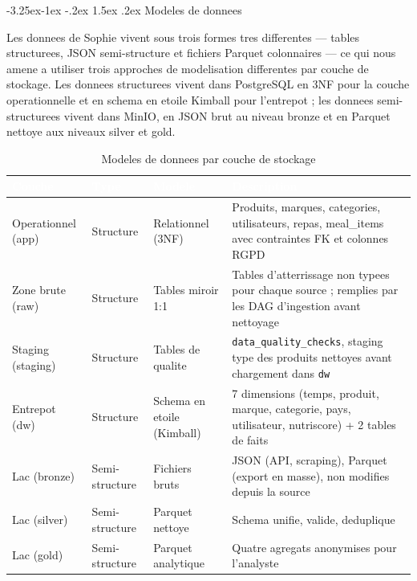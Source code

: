 \documentclass[a4paper,11pt,oneside,openany]{report}
\makeatletter
\renewcommand\subsubsection{\@startsection{subsubsection}{3}{\z@}%
  {-3.25ex\@plus -1ex \@minus -.2ex}%
  {1.5ex \@plus .2ex}%
  {\normalfont\normalsize\bfseries\color{ntblue}}}
\newcommand{\rgpd}{RGPD}
\makeatother
\begin{document}
\subsubsection{Modeles de donnees}

Les donnees de Sophie vivent sous trois formes tres differentes ---
tables structurees, JSON semi-structure et fichiers Parquet
colonnaires --- ce qui nous amene a utiliser trois approches de
modelisation differentes par couche de stockage. Les donnees
structurees vivent dans PostgreSQL en 3NF pour la couche
operationnelle et en schema en etoile Kimball pour l'entrepot ; les
donnees semi-structurees vivent dans MinIO, en JSON brut au niveau
bronze et en Parquet nettoye aux niveaux silver et gold.

\begin{table}[H]
\centering
\caption{Modeles de donnees par couche de stockage}
\label{tab:data-models-topo}
\begin{tabularx}{\textwidth}{L{2.5cm} L{2cm} L{3.5cm} L{4.5cm}}
\toprule
{}
\textcolor{white}{\textbf{Couche}} & \textcolor{white}{\textbf{Type}} & \textcolor{white}{\textbf{Modele}} & \textcolor{white}{\textbf{Description}} \\
\midrule
{}
Operationnel (app) & Structure & Relationnel (3NF) & Produits, marques, categories, utilisateurs, repas, meal\_items avec contraintes FK et colonnes \rgpd{} \\
Zone brute (raw) & Structure & Tables miroir 1:1 & Tables d'atterrissage non typees pour chaque source ; remplies par les DAG d'ingestion avant nettoyage \\
Staging (staging) & Structure & Tables de qualite & \texttt{data\_quality\_checks}, staging type des produits nettoyes avant chargement dans \texttt{dw} \\
Entrepot (dw) & Structure & Schema en etoile (Kimball) & 7 dimensions (temps, produit, marque, categorie, pays, utilisateur, nutriscore) + 2 tables de faits \\
Lac (bronze) & Semi-structure & Fichiers bruts & JSON (API, scraping), Parquet (export en masse), non modifies depuis la source \\
Lac (silver) & Semi-structure & Parquet nettoye & Schema unifie, valide, deduplique \\
Lac (gold) & Semi-structure & Parquet analytique & Quatre agregats anonymises pour l'analyste \\
\bottomrule
\end{tabularx}
\end{table}
\end{document}
